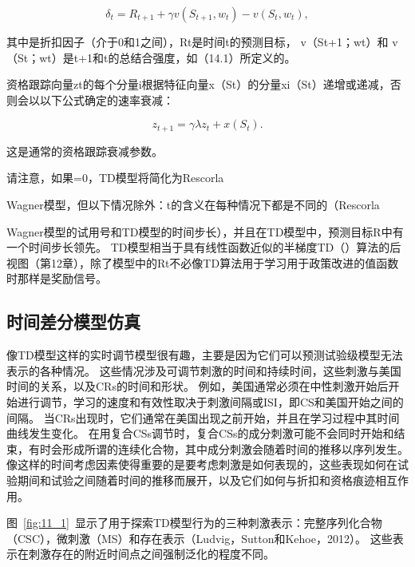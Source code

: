{{{{{{{{{{{{{{{{	
\begin{equation}\label{key}
	\delta_t = 
		R_{t+1} + \gamma v (S_{t+1}, w_t) - v(S_t, w_t),
\end{equation}


其中是折扣因子（介于0和1之间），Rt是时间t的预测目标， v（St+1；wt）和 v（St；wt）是t+1和t的总结合强度，如（14.1）所定义的。


资格跟踪向量zt的每个分量i根据特征向量x（St）的分量xi（St）递增或递减，否则会以以下公式确定的速率衰减：

\begin{equation}\label{key}
	z_{t+1} = \gamma \lambda z_t 
		+ x(S_t).
\end{equation}

这是通常的资格跟踪衰减参数。

请注意，如果=0，TD模型将简化为Rescorla{Wagner模型，但以下情况除外：t的含义在每种情况下都是不同的（Rescorla{Wagner模型的试用号和TD模型的时间步长），并且在TD模型中，预测目标R中有一个时间步长领先。
TD模型相当于具有线性函数近似的半梯度TD（）算法的后视图（第12章），除了模型中的Rt不必像TD算法用于学习用于政策改进的值函数时那样是奖励信号。



\subsection{时间差分模型仿真} \label{sec:td_simulation}

像TD模型这样的实时调节模型很有趣，主要是因为它们可以预测试验级模型无法表示的各种情况。
这些情况涉及可调节刺激的时间和持续时间，这些刺激与美国时间的关系，以及CRs的时间和形状。
例如，美国通常必须在中性刺激开始后开始进行调节，学习的速度和有效性取决于刺激间隔或ISI，即CS和美国开始之间的间隔。
当CRs出现时，它们通常在美国出现之前开始，并且在学习过程中其时间曲线发生变化。
在用复合CSs调节时，复合CSs的成分刺激可能不会同时开始和结束，有时会形成所谓的连续化合物，其中成分刺激会随着时间的推移以序列发生。
像这样的时间考虑因素使得重要的是要考虑刺激是如何表现的，这些表现如何在试验期间和试验之间随着时间的推移而展开，以及它们如何与折扣和资格痕迹相互作用。


图~\ref{fig:11_1}~显示了用于探索TD模型行为的三种刺激表示：完整序列化合物（CSC），微刺激（MS）和存在表示（Ludvig，Sutton和Kehoe，2012）。
这些表示在刺激存在的附近时间点之间强制泛化的程度不同。


}}}}}}}}}}}}}}}}}}
